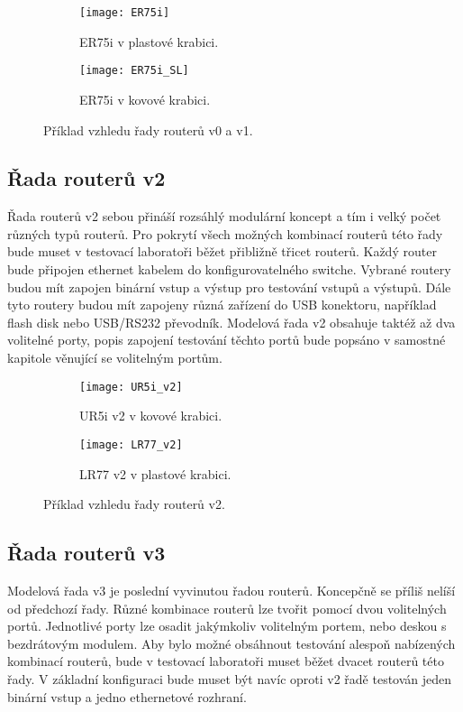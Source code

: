 \begin{figure}[h]
  \begin{subfigure}[h]{0.5\LW}
    \centering
    \texttt{[image: ER75i]}
    \caption{ER75i v plastové krabici.}
    \label{fig:ER75i}
  \end{subfigure}
  \begin{subfigure}[h]{0.5\LW}
    \centering
    \texttt{[image: ER75i\_SL]}
    \caption{ER75i v kovové krabici.}
    \label{fig:ER75i SL}
  \end{subfigure}
  \caption{Příklad vzhledu řady routerů v0 a v1.}
  \label{fig:ER75i}
\end{figure}

\subsection{Řada routerů v2}
Řada routerů v2 sebou přináší rozsáhlý modulární koncept a tím i velký počet různých typů routerů. Pro pokrytí všech možných kombinací routerů této řady bude muset v testovací laboratoři běžet přibližně třicet routerů. Každý router bude připojen ethernet kabelem do konfigurovatelného switche. Vybrané routery budou mít zapojen binární vstup a výstup pro testování vstupů a výstupů. Dále tyto routery budou mít zapojeny různá zařízení do USB konektoru, například flash disk nebo USB/RS232 převodník. Modelová řada v2 obsahuje taktéž až dva volitelné porty, popis zapojení testování těchto portů bude popsáno v samostné kapitole věnující se volitelným portům.

\begin{figure}[h]
  \begin{subfigure}[h]{0.5\LW}
    \centering
    \texttt{[image: UR5i\_v2]}
    \caption{UR5i v2 v kovové krabici.}
    \label{fig:UR5i_v2}
  \end{subfigure}
  \begin{subfigure}[h]{0.5\LW}
    \centering
    \texttt{[image: LR77\_v2]}
    \caption{LR77 v2 v plastové krabici.}
    \label{fig:LR77_v2}
  \end{subfigure}
  \caption{Příklad vzhledu řady routerů v2.}
  \label{fig:UR5i_v2}
\end{figure}

\subsection{Řada routerů v3}
Modelová řada v3 je poslední vyvinutou řadou routerů. Koncepčně se příliš nelíší od předchozí řady. Různé kombinace routerů lze tvořit pomocí dvou volitelných portů. Jednotlivé porty lze osadit jakýmkoliv volitelným portem, nebo deskou s bezdrátovým modulem. Aby bylo možné obsáhnout testování alespoň nabízených kombinací routerů, bude v testovací laboratoři muset běžet dvacet routerů této řady. V základní konfiguraci bude muset být navíc oproti v2 řadě testován jeden binární vstup a jedno ethernetové rozhraní.

